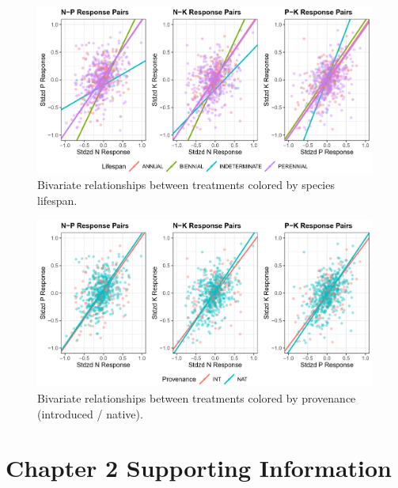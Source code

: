 \documentclass[twoside,12pt,final]{ucthesis-CA2012}
\begin{document}
\begin{ucmainmatter}
\begin{table}[ht]
\end{table}
\begin{figure}
\centering
\includegraphics[width=\textwidth,height=0.4\textheight]{figure/AppFig1_1.png}
\caption{Bivariate relationships between treatments colored by species lifespan. \label{app-1-1}}
\end{figure}
\begin{figure}
\centering
\includegraphics[width=\textwidth,height=0.4\textheight]{figure/AppFig1_2.png}
\caption{Bivariate relationships between treatments colored by provenance (introduced / native). \label{app-1-2}}
\end{figure}
\hypertarget{chapter-2-supporting-information}{%
\chapter{Chapter 2 Supporting Information}\label{chapter-2-supporting-information}}

\hypertarget{chapter-3-supporting-information}{%
}
\end{ucmainmatter}
\end{document}
